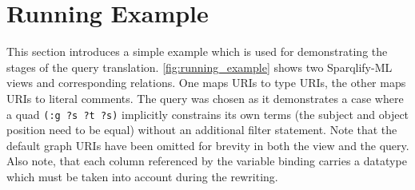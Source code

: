 \documentclass[a4paper,twoside,bibtotoc,abstracton,12pt,BCOR=15mm]{scrreprt}
\begin{document}
\section{Running Example}
This section introduces a simple example which is used for demonstrating the stages of the query translation.
\autoref{fig:running_example} shows two Sparqlify-ML views and
corresponding relations. One maps URIs to type URIs, the other maps URIs to literal comments.
The query was chosen as it demonstrates a case where a quad \texttt{(:g ?s ?t ?s)} implicitly constrains its own terms (the subject and object position need to be equal)
without an additional filter statement. Note that the default graph URIs have been omitted for brevity in both the view and the query.
Also note, that each column referenced by the variable binding carries a datatype which must be taken into account during the rewriting.  
\end{document}
